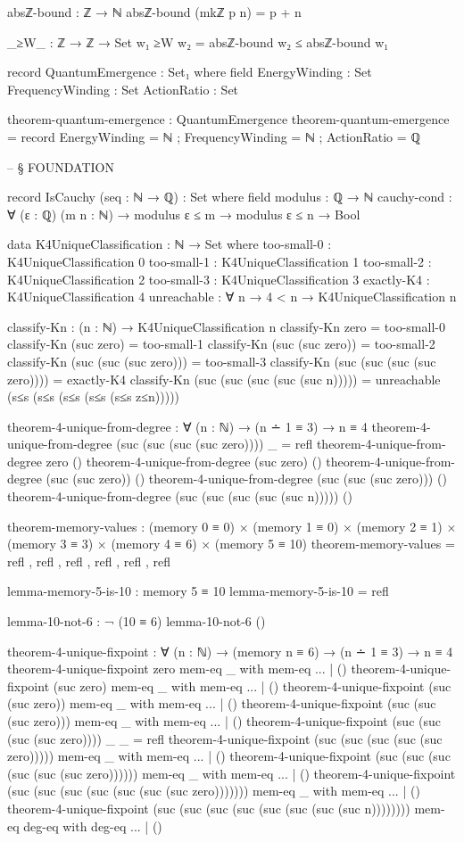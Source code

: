 \documentclass[11pt,a4paper]{book}
\begin{document}
\begin{code}
absℤ-bound : ℤ → ℕ
absℤ-bound (mkℤ p n) = p + n

_≥W_ : ℤ → ℤ → Set
w₁ ≥W w₂ = absℤ-bound w₂ ≤ absℤ-bound w₁

record QuantumEmergence : Set₁ where
  field
    EnergyWinding    : Set
    FrequencyWinding : Set
    ActionRatio      : Set

theorem-quantum-emergence : QuantumEmergence
theorem-quantum-emergence = record
  { EnergyWinding    = ℕ
  ; FrequencyWinding = ℕ
  ; ActionRatio      = ℚ
  }


-- § FOUNDATION

record IsCauchy (seq : ℕ → ℚ) : Set where
  field
    modulus : ℚ → ℕ
    cauchy-cond : ∀ (ε : ℚ) (m n : ℕ) → 
                  modulus ε ≤ m → modulus ε ≤ n → Bool

data K4UniqueClassification : ℕ → Set where
  too-small-0  : K4UniqueClassification 0
  too-small-1  : K4UniqueClassification 1
  too-small-2  : K4UniqueClassification 2  
  too-small-3  : K4UniqueClassification 3
  exactly-K4   : K4UniqueClassification 4
  unreachable  : ∀ {n} → 4 < n → K4UniqueClassification n

classify-Kn : (n : ℕ) → K4UniqueClassification n
classify-Kn zero = too-small-0
classify-Kn (suc zero) = too-small-1
classify-Kn (suc (suc zero)) = too-small-2
classify-Kn (suc (suc (suc zero))) = too-small-3
classify-Kn (suc (suc (suc (suc zero)))) = exactly-K4
classify-Kn (suc (suc (suc (suc (suc n))))) = unreachable (s≤s (s≤s (s≤s (s≤s (s≤s z≤n)))))

theorem-4-unique-from-degree : ∀ (n : ℕ) → 
  (n ∸ 1 ≡ 3) →
  n ≡ 4
theorem-4-unique-from-degree (suc (suc (suc (suc zero)))) _ = refl
theorem-4-unique-from-degree zero ()
theorem-4-unique-from-degree (suc zero) ()
theorem-4-unique-from-degree (suc (suc zero)) ()
theorem-4-unique-from-degree (suc (suc (suc zero))) ()
theorem-4-unique-from-degree (suc (suc (suc (suc (suc n))))) ()

theorem-memory-values : (memory 0 ≡ 0) × (memory 1 ≡ 0) × (memory 2 ≡ 1) × 
                        (memory 3 ≡ 3) × (memory 4 ≡ 6) × (memory 5 ≡ 10)
theorem-memory-values = refl , refl , refl , refl , refl , refl

lemma-memory-5-is-10 : memory 5 ≡ 10
lemma-memory-5-is-10 = refl

lemma-10-not-6 : ¬ (10 ≡ 6)
lemma-10-not-6 ()

theorem-4-unique-fixpoint : ∀ (n : ℕ) → 
  (memory n ≡ 6) →
  (n ∸ 1 ≡ 3) →
  n ≡ 4
theorem-4-unique-fixpoint zero mem-eq _ with mem-eq
... | ()
theorem-4-unique-fixpoint (suc zero) mem-eq _ with mem-eq
... | ()
theorem-4-unique-fixpoint (suc (suc zero)) mem-eq _ with mem-eq  
... | ()
theorem-4-unique-fixpoint (suc (suc (suc zero))) mem-eq _ with mem-eq
... | ()
theorem-4-unique-fixpoint (suc (suc (suc (suc zero)))) _ _ = refl
theorem-4-unique-fixpoint (suc (suc (suc (suc (suc zero))))) mem-eq _ with mem-eq
... | ()
theorem-4-unique-fixpoint (suc (suc (suc (suc (suc (suc zero)))))) mem-eq _ with mem-eq
... | ()
theorem-4-unique-fixpoint (suc (suc (suc (suc (suc (suc (suc zero))))))) mem-eq _ with mem-eq
... | ()
theorem-4-unique-fixpoint (suc (suc (suc (suc (suc (suc (suc (suc n)))))))) mem-eq deg-eq 
  with deg-eq
... | ()


\end{code}
\end{document}
